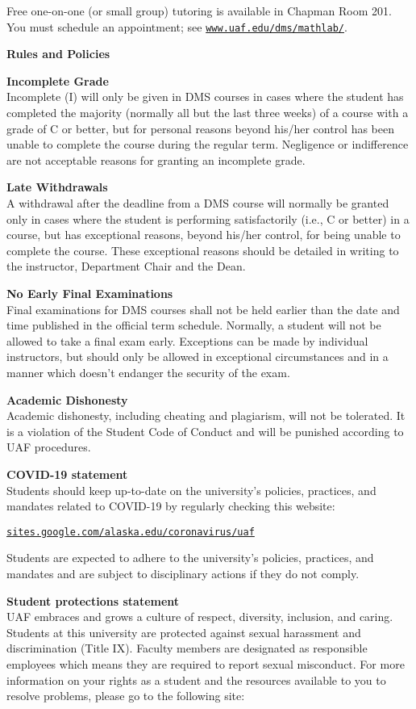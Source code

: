 \documentclass[12pt]{article}
\renewcommand{\emph}[1]{\textsf{\textbf{#1}}}
\newcommand{\localhead}[1]{\par\smallskip\textbf{#1} \smallskip\nobreak\\}%
\def\heading#1{\localhead{\large\emph{#1}}}
\def\subheading#1{\localhead{\emph{#1}}}
\begin{document}
Free one-on-one (or small group) tutoring is available in Chapman Room 201. You must schedule an appointment; see \href{http://www.uaf.edu/dms/mathlab/}{\texttt{www.uaf.edu/dms/mathlab/}}.

\heading{Rules and Policies}
\vskip -20pt

\subheading{Incomplete Grade} 
Incomplete (I) will only be given in
  DMS courses in cases where
  the student has completed the majority (normally all but the last
  three weeks) of a course with a grade of C or better, but for
  personal reasons beyond his/her control has been unable to complete
  the course during the regular term. Negligence or indifference are
  not acceptable reasons for granting an incomplete grade.

\subheading{Late Withdrawals} 
A withdrawal after the deadline from a DMS course will
  normally be granted only in cases where the student is performing
  satisfactorily (i.e., C or better) in a course, but has exceptional
  reasons, beyond his/her control, for being unable to complete the
  course.  These exceptional reasons should be detailed in writing to
  the instructor, Department Chair and the Dean.

\subheading{No Early Final Examinations}
Final examinations for DMS
  courses shall not be held earlier than the date and time published
  in the official term schedule. Normally, a student will not be
  allowed to take a final exam early. Exceptions can be made by
  individual instructors, but should only be allowed in exceptional
  circumstances and in a manner which doesn't endanger the security of
  the exam.

\subheading{Academic Dishonesty}
Academic dishonesty, including cheating and plagiarism, will not
be tolerated.  It is a violation of the Student Code of Conduct
and will be punished according to UAF procedures.
 
\subheading{COVID-19 statement}
Students should keep up-to-date on the university's policies, practices, and mandates related to COVID-19 by regularly checking this website:

\href{https://sites.google.com/alaska.edu/coronavirus/uaf?authuser=0}{\texttt{sites.google.com/alaska.edu/coronavirus/uaf}}

Students are expected to adhere to the university's policies, practices, and mandates and are subject to disciplinary actions if they do not comply.

\subheading{Student protections statement}
UAF embraces and grows a culture of respect, diversity, inclusion, and caring. Students at this university are protected against sexual harassment and discrimination (Title IX). Faculty members are designated as responsible employees which means they are required to report sexual misconduct. For more information on your rights as a student and the resources available to you to resolve problems, please go to the following site:
\end{document}
